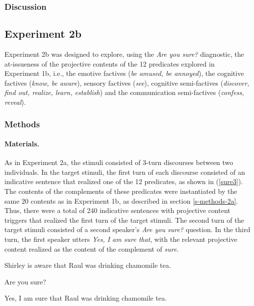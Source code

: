 \documentclass[11pt,fleqn]{article}
\newcommand{\6}{\mbox{$[\hspace*{-.6mm}[$}}
\newcommand{\9}{\mbox{$]\hspace*{-.6mm}]$}}
\begin{document}
\subsubsection{Discussion}

\subsection{Experiment 2b} 

Experiment 2b was designed to explore, using the {\em Are you sure?} diagnostic, the at-issueness of the projective contents of the 12 predicates explored in Experiment 1b, i.e., the emotive factives ({\em be amused, be annoyed}), the cognitive factives ({\em know, be aware}), sensory factives ({\em see}), cognitive semi-factives ({\em discover, find out, realize, learn, establish}) and the communication semi-factives ({\em confess, reveal}).

\subsubsection{Methods}


\paragraph{Materials.} As in Experiment 2a, the stimuli consisted of 3-turn discourses between two individuals. In the target stimuli, the first turn of each discourse consisted of an indicative sentence that realized one of the 12 predicates, as shown in (\ref{sure3}). The contents of the complements of these predicates were instantiated by the same 20 contents as in Experiment 1b, as described in section \ref{s-methods-2a}. Thus, there were a total of 240 indicative sentences with projective content triggers that realized the first turn of the target stimuli. The second turn of the target stimuli consisted of a second speaker's {\em Are you sure?} question. In the third turn, the first speaker utters {\em Yes, I am sure that}, with the relevant projective content realized as the content of the complement of {\em sure}. 

\begin{exe}
\ex\label{sure3}
\begin{xlist}
 Shirley is aware that Raul was drinking chamomile tea.

 Are you sure?

 Yes, I am sure that Raul was drinking chamomile tea.
\end{xlist}
\end{exe}
\end{document}
